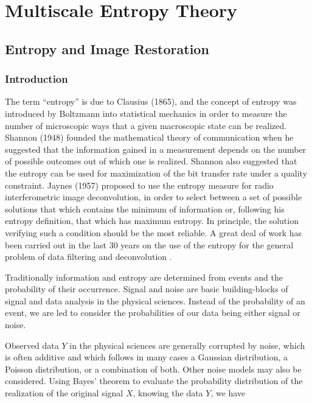 
\chapter{Multiscale Entropy Theory}
\label{ch_entrop}
\section{Entropy and Image Restoration}

\subsection{Introduction}

The term ``entropy'' is due to Clausius (1865), and the concept of 
entropy was introduced by Boltzmann into statistical mechanics
in order to measure the number of microscopic ways that a given macroscopic
state can be realized. Shannon (1948) \cite{ima:shannon48} founded the mathematical theory of
communication when he suggested that the information gained in a 
measurement depends on the number of possible outcomes out of 
which one is realized. Shannon also suggested that 
the entropy can be used for maximization of the bit transfer rate under
a quality constraint. Jaynes (1957) \cite{entropy:jaynes57} 
proposed to use the entropy measure
for radio interferometric image deconvolution,  in
order to select between a set of possible solutions that which contains the
minimum of information or, following his entropy definition, that 
which has maximum entropy. In principle, the solution verifying such 
a condition should be the most reliable. A great deal of work has been 
carried out 
in the last 30 years on the use of the entropy for the general problem
of data filtering and deconvolution 
\cite{entropy:ables74,entropy:bontekoe94,entropy:burg67,entropy:frieden75,entropy:gull91,entropy:narrayan86,starck:pan96,entropy:skilling89,entropy:weir92,entropy:djafari94,entropy:djafari98}. 

Traditionally information and entropy are determined from events and the
probability of their occurrence.  Signal and noise are basic building-blocks 
of signal and data analysis in the physical sciences.  Instead of the 
probability of an event, we are led to consider the probabilities of our
data being either signal or noise. 

Observed data $Y$ in the physical sciences 
are generally corrupted by noise, which is often additive and which 
follows in many cases a Gaussian distribution, a Poisson distribution, or
a combination of both.  Other noise models may also be considered.
 Using Bayes' theorem to evaluate the probability distribution of the 
realization of the original signal $X$,
knowing the data $Y$, we have
 

